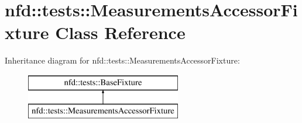 \hypertarget{classnfd_1_1tests_1_1MeasurementsAccessorFixture}{}\section{nfd\+:\+:tests\+:\+:Measurements\+Accessor\+Fixture Class Reference}
\label{classnfd_1_1tests_1_1MeasurementsAccessorFixture}
Inheritance diagram for nfd\+:\+:tests\+:\+:Measurements\+Accessor\+Fixture\+:\begin{figure}[H]
\begin{center}
\leavevmode
\includegraphics[height=2.000000cm]{classnfd_1_1tests_1_1MeasurementsAccessorFixture}
\end{center}
\end{figure}
